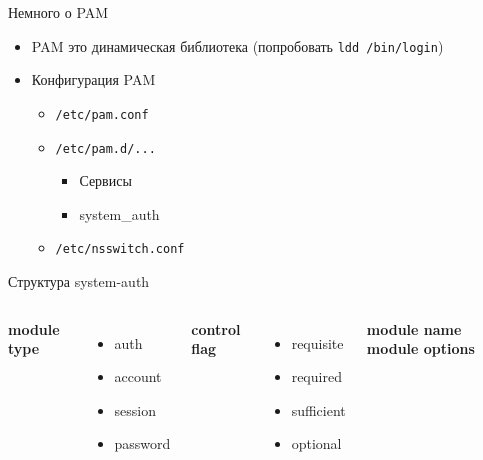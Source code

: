 \documentclass[ignorenonframetext, professionalfonts, hyperref={pdftex, unicode}]{beamer}
\begin{document}
\begin{frame}{Немного о PAM}
  \begin{itemize}
    \item PAM это динамическая библиотека (попробовать {\tt ldd /bin/login})
    \item Конфигурация PAM
      \begin{itemize}
        \item {\tt /etc/pam.conf}
        \item {\tt /etc/pam.d/...}
          \begin{itemize}
            \item Сервисы
            \item system\_auth
          \end{itemize}
        \item {\tt /etc/nsswitch.conf}
       \end{itemize}
    \end{itemize}
\end{frame}

\begin{frame}{Структура system-auth}

\begin{columns}
 \textbf{module type}
 \begin{itemize}
   \item auth
   \item account
   \item session
   \item password
  \end{itemize}
   \textbf{control flag}
   \begin{itemize}
     \item requisite
     \item required
     \item sufficient
     \item optional
   \end{itemize}
   \textbf{module name}
   \textbf{module options}
  \end{columns}
\end{frame}
\end{document}
